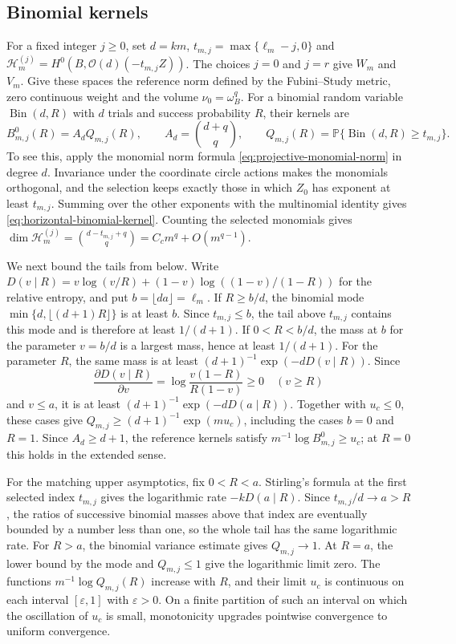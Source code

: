 \subsection{Binomial kernels}

For a fixed integer $j\geq0$, set $d=km$, $t_{m,j}=\max\{\ell_m-j,0\}$ and
$\mathcal H_m^{(j)}=H^0(B,\mathcal O(d)(-t_{m,j}Z))$.
The choices $j=0$ and $j=r$ give $W_m$ and $V_m$. Give these spaces the reference norm defined by the Fubini--Study metric, zero continuous weight and the volume $\nu_0=\omega_B^q$. For a binomial random variable $\operatorname{Bin}(d,R)$ with $d$ trials and success probability $R$, their kernels are
\begin{equation}\label{eq:horizontal-binomial-kernel}
 B_{m,j}^0(R)=A_dQ_{m,j}(R),\qquad
 A_d=\binom{d+q}{q},\qquad
 Q_{m,j}(R)=\mathbb P\{\operatorname{Bin}(d,R)\geq t_{m,j}\}.
\end{equation}
To see this, apply the monomial norm formula \eqref{eq:projective-monomial-norm} in degree $d$. Invariance under the coordinate circle actions makes the monomials orthogonal, and the selection keeps exactly those in which $Z_0$ has exponent at least $t_{m,j}$. Summing over the other exponents with the multinomial identity gives \eqref{eq:horizontal-binomial-kernel}. Counting the selected monomials gives
$\dim\mathcal H_m^{(j)}=\binom{d-t_{m,j}+q}{q}=C_cm^q+O(m^{q-1})$.

We next bound the tails from below. Write
$D(v\mid R)=v\log(v/R)+(1-v)\log((1-v)/(1-R))$ for the relative entropy, and put $b=\lfloor da\rfloor=\ell_m$.
If $R\geq b/d$, the binomial mode $\min\{d,\lfloor(d+1)R\rfloor\}$ is at least $b$. Since $t_{m,j}\leq b$, the tail above $t_{m,j}$ contains this mode and is therefore at least $1/(d+1)$. If $0<R<b/d$, the mass at $b$ for the parameter $v=b/d$ is a largest mass, hence at least $1/(d+1)$. For the parameter $R$, the same mass is at least
$(d+1)^{-1}\exp(-dD(v\mid R))$.
Since
\[
 \frac{\partial D(v\mid R)}{\partial v}
       =\log\frac{v(1-R)}{R(1-v)}\geq0\quad(v\geq R)
\]
and $v\leq a$, it is at least $(d+1)^{-1}\exp(-dD(a\mid R))$.
Together with $u_c\leq0$, these cases give
$Q_{m,j}\geq(d+1)^{-1}\exp(mu_c)$, including the cases $b=0$ and $R=1$.
Since $A_d\geq d+1$, the reference kernels satisfy $m^{-1}\log B_{m,j}^0\geq u_c$; at $R=0$ this holds in the extended sense.

For the matching upper asymptotics, fix $0<R<a$. Stirling's formula at the first selected index $t_{m,j}$ gives the logarithmic rate $-kD(a\mid R)$. Since $t_{m,j}/d\to a>R$, the ratios of successive binomial masses above that index are eventually bounded by a number less than one, so the whole tail has the same logarithmic rate. For $R>a$, the binomial variance estimate gives $Q_{m,j}\to1$. At $R=a$, the lower bound by the mode and $Q_{m,j}\leq1$ give the logarithmic limit zero. The functions $m^{-1}\log Q_{m,j}(R)$ increase with $R$, and their limit $u_c$ is continuous on each interval $[\varepsilon,1]$ with $\varepsilon>0$. On a finite partition of such an interval on which the oscillation of $u_c$ is small, monotonicity upgrades pointwise convergence to uniform convergence.

